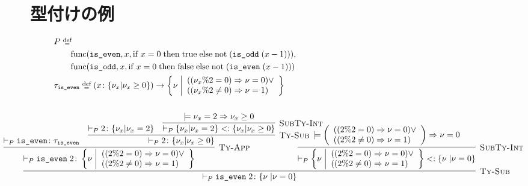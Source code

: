 \section{型付けの例}
\label{sec:typing:example}

\begin{align*}
  & P \; \defeq \; \\
  &\quad\quad \Func{\code{is\_even}}{x}{\If{\; x = 0 \;}{\; \true \;}{\; \App{\mathrm{not}}{\paren{\App{\code{is\_odd}}{\paren{x - 1}}}}}}, \\
  &\quad\quad \Func{\code{is\_odd}}{x}{\If{\; x = 0 \;}{\; \false \;}{\; \App{\mathrm{not}}{\paren{\App{\code{is\_even}}{\paren{x - 1}}}}}} \\
  & \tau_\code{is\_even} \; \defeq \; \TyFunc{x}{\TyInt{\nu_x}{\nu_x \geq 0}}{\left\TyInt{\nu \; \middle}{\begin{array}{l}
            \paren{\paren{\nu_x \% 2 = 0} \Rightarrow \nu = 0} \lor \\
            \paren{\paren{\nu_x \% 2 \neq 0} \Rightarrow \nu = 1}
  \end{array}\right}} \\\\
  &\hspace{-6em} \infer[\TyRuleSub] {
    \TyJudge{P}{}{\App{\code{is\_even}}{2}}{\TyInt{\nu \;}{\nu = 0}}
  } {
    \infer[\TyRuleApp] {
      \TyJudge{P}{}{\App{\code{is\_even}}{2}}{\left\TyInt{\nu \; \middle}{\begin{array}{l}
        \paren{\paren{2 \% 2 = 0} \Rightarrow \nu = 0} \lor \\
        \paren{\paren{2 \%2 \neq 0} \Rightarrow \nu = 1}
      \end{array} \right}}
    } {
      \TyJudge{P}{}
        {\code{is\_even}}
        {\tau_\code{is\_even}}
      & \infer[\TyRuleSub] {
        \TyJudge{P}{}{2}{\TyInt{\nu_x}{\nu_x \geq 0}}
      } {
        \TyJudge{P}{}{2}{\TyInt{\nu_x}{\nu_x = 2}}
        & \infer[\SubTyRuleInt] {
          \SubTyJudge{P}{}{\TyInt{\nu_x}{\nu_x = 2}}{\TyInt{\nu_x}{\nu_x \geq 0}}
        } {
          \models \nu_x = 2 \Rightarrow \nu_x \geq 0
        }
      }
    }
    & \hspace{-4em} \infer[\SubTyRuleInt] {
      \SubTyJudge{P}{}{\left\TyInt{\nu \; \middle}{\begin{array}{l}
        \paren{\paren{2 \% 2 = 0} \Rightarrow \nu = 0} \lor \\
        \paren{\paren{2 \%2 \neq 0} \Rightarrow \nu = 1}
      \end{array} \right}}{\TyInt{\nu \;}{\nu = 0}}
    } {
      \models \left\paren{\begin{array}{l}
        \paren{\paren{2 \% 2 = 0} \Rightarrow \nu = 0} \lor \\
        \paren{\paren{2 \%2 \neq 0} \Rightarrow \nu = 1}
      \end{array}\right}
      \Rightarrow \nu = 0
    }
  }
\end{align*}

